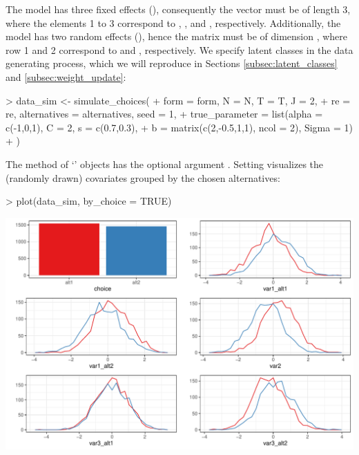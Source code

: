 \documentclass[article,shortnames]{jss}
\newcommand{\class}[1]{`\code{#1}'}
\newcommand{\fct}[1]{\code{#1()}}
\begin{document}
The model has three fixed effects (), consequently the vector  must be of length 3, where the elements 1 to 3 correspond to , , and , respectively. Additionally, the model has two random effects (), hence the matrix  must be of dimension , where row 1 and 2 correspond to  and , respectively. We specify  latent classes in the data generating process, which we will reproduce in Sections \ref{subsec:latent_classes} and \ref{subsec:weight_update}:

\begin{Schunk}
\begin{Sinput}
> data_sim <- simulate_choices(
+    form = form, N = N, T = T, J = 2,
+    re = re, alternatives = alternatives, seed = 1,
+    true_parameter = list(alpha = c(-1,0,1), C = 2, s = c(0.7,0.3),
+                          b = matrix(c(2,-0.5,1,1), ncol = 2), Sigma = 1)
+  )
\end{Sinput}
\end{Schunk}

The \fct{plot} method of \class{RprobitB\_data} objects has the optional argument . Setting  visualizes the (randomly drawn) covariates grouped by the chosen alternatives:

\begin{Schunk}
\begin{Sinput}
> plot(data_sim, by_choice = TRUE)
\end{Sinput}
\end{Schunk}
\includegraphics{rprobitb_oelschlaeger_bauer-sim-data}
\end{document}
